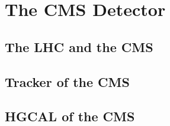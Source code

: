 \chapter{The CMS Detector}\label{sec:detectors}

\section{The LHC and the CMS}



\section{Tracker of the CMS}



\section{HGCAL of the CMS}
